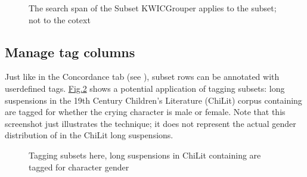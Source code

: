 \documentclass[letterpaper,10pt,english]{sphinxmanual}
\begin{document}
\begin{figure}[htbp]
\centering
\capstart

\noindent{}
\caption{The search span of the Subset KWICGrouper applies to the
subset; not to the co\sphinxhyphen{}text}\label{\detokenize{clicanalysis/subsets:id7}}\label{\detokenize{clicanalysis/subsets:figure-analysis-subsets-kwicgrouper-criedscreamedsobbed}}\end{figure}


\subsection{Manage tag columns}
\label{\detokenize{clicanalysis/subsets:manage-tag-columns}}
\sphinxAtStartPar
Just like in the Concordance tab (see {\hyperref[\detokenize{clicanalysis/concordance:concordance}]{}}), subset rows can be
annotated with user\sphinxhyphen{}defined tags.
\hyperref[\detokenize{clicanalysis/subsets:figure-analysis-subsets-tagcolumns-gender}]{Fig.\@ \ref{\detokenize{clicanalysis/subsets:figure-analysis-subsets-tagcolumns-gender}}} shows a
potential application of tagging subsets: long suspensions in the 19th
Century Children’s Literature (ChiLit) corpus containing  are
tagged for whether the crying character is male or female. Note that
this screenshot just illustrates the technique; it does not represent
the actual gender distribution of  in the ChiLit long
suspensions.

\begin{figure}[htbp]
\centering
\capstart

\noindent{}
\caption{Tagging subsets \textendash{} here, long suspensions in ChiLit
containing  are tagged for character gender}\label{\detokenize{clicanalysis/subsets:id8}}\label{\detokenize{clicanalysis/subsets:figure-analysis-subsets-tagcolumns-gender}}\end{figure}

\sphinxstepscope
\end{document}
